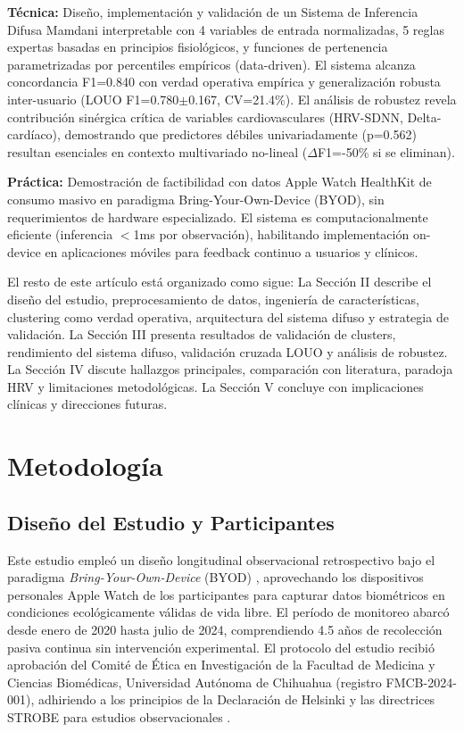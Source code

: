 \documentclass[journal,twoside,web]{ieeecolor}
\begin{document}
\textbf{Técnica:} Diseño, implementación y validación de un Sistema de Inferencia Difusa Mamdani interpretable con 4 variables de entrada normalizadas, 5 reglas expertas basadas en principios fisiológicos, y funciones de pertenencia parametrizadas por percentiles empíricos (data-driven). El sistema alcanza concordancia F1=0.840 con verdad operativa empírica y generalización robusta inter-usuario (LOUO F1=0.780$\pm$0.167, CV=21.4\%). El análisis de robustez revela contribución sinérgica crítica de variables cardiovasculares (HRV-SDNN, Delta-cardíaco), demostrando que predictores débiles univariadamente (p=0.562) resultan esenciales en contexto multivariado no-lineal ($\Delta$F1=-50\% si se eliminan).

\textbf{Práctica:} Demostración de factibilidad con datos Apple Watch HealthKit de consumo masivo en paradigma Bring-Your-Own-Device (BYOD), sin requerimientos de hardware especializado. El sistema es computacionalmente eficiente (inferencia $<$1ms por observación), habilitando implementación on-device en aplicaciones móviles para feedback continuo a usuarios y clínicos.

El resto de este artículo está organizado como sigue: La Sección II describe el diseño del estudio, preprocesamiento de datos, ingeniería de características, clustering como verdad operativa, arquitectura del sistema difuso y estrategia de validación. La Sección III presenta resultados de validación de clusters, rendimiento del sistema difuso, validación cruzada LOUO y análisis de robustez. La Sección IV discute hallazgos principales, comparación con literatura, paradoja HRV y limitaciones metodológicas. La Sección V concluye con implicaciones clínicas y direcciones futuras.


\section{Metodología}
\label{sec:metodologia}

\subsection{Diseño del Estudio y Participantes}
\label{subsec:diseno}

Este estudio empleó un diseño longitudinal observacional retrospectivo bajo el paradigma \textit{Bring-Your-Own-Device} (BYOD) \cite{Liu2022}, aprovechando los dispositivos personales Apple Watch de los participantes para capturar datos biométricos en condiciones ecológicamente válidas de vida libre. El período de monitoreo abarcó desde enero de 2020 hasta julio de 2024, comprendiendo 4.5 años de recolección pasiva continua sin intervención experimental. El protocolo del estudio recibió aprobación del Comité de Ética en Investigación de la Facultad de Medicina y Ciencias Biomédicas, Universidad Autónoma de Chihuahua (registro FMCB-2024-001), adhiriendo a los principios de la Declaración de Helsinki \cite{WMA2013} y las directrices STROBE para estudios observacionales \cite{VonElm2007STROBE}.
\end{document}
